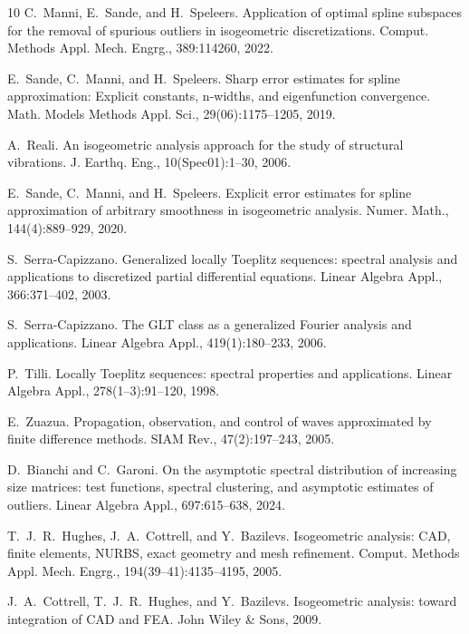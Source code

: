 \documentclass[11pt]{article}
\begin{document}
\begin{thebibliography}{10}
C.~Manni, E.~Sande, and H.~Speleers.
\newblock Application of optimal spline subspaces for the removal of spurious outliers in isogeometric discretizations.
\newblock Comput. Methods Appl. Mech. Engrg., 389:114260, 2022.

E.~Sande, C.~Manni, and H.~Speleers.
\newblock Sharp error estimates for spline approximation: Explicit constants, n-widths, and eigenfunction convergence.
\newblock Math. Models Methods Appl. Sci., 29(06):1175--1205, 2019.


A.~Reali.
\newblock An isogeometric analysis approach for the study of structural vibrations.
\newblock J. Earthq. Eng., 10(Spec01):1--30, 2006.


E.~Sande, C.~Manni, and H.~Speleers.
\newblock Explicit error estimates for spline approximation of arbitrary smoothness in isogeometric analysis.
\newblock Numer. Math., 144(4):889--929, 2020.


S.~Serra-Capizzano.
\newblock Generalized locally {Toeplitz} sequences: spectral analysis and applications to discretized partial differential equations.
\newblock Linear Algebra Appl., 366:371--402, 2003.

S.~Serra-Capizzano.
\newblock The {GLT} class as a generalized {Fourier} analysis and applications.
\newblock Linear Algebra Appl., 419(1):180--233, 2006.

P.~Tilli.
\newblock Locally {Toeplitz} sequences: spectral properties and applications.
\newblock Linear Algebra Appl., 278(1--3):91--120, 1998.


E.~Zuazua.
\newblock Propagation, observation, and control of waves approximated by finite difference methods.
\newblock SIAM Rev., 47(2):197--243, 2005.


D.~Bianchi and C.~Garoni.
\newblock On the asymptotic spectral distribution of increasing size matrices: test functions, spectral clustering, and asymptotic estimates of outliers.
\newblock Linear Algebra Appl., 697:615--638, 2024.



T.~J.~R.~Hughes, J.~A.~Cottrell, and Y.~Bazilevs.
\newblock Isogeometric analysis: {CAD}, finite elements, {NURBS}, exact geometry and mesh refinement.
\newblock Comput. Methods Appl. Mech. Engrg., 194(39--41):4135--4195, 2005.



J.~A.~Cottrell, T.~J.~R.~Hughes, and Y.~Bazilevs.
\newblock Isogeometric analysis: toward integration of {CAD} and {FEA}.
\newblock John Wiley \& Sons, 2009.






\end{thebibliography}
\end{document}
